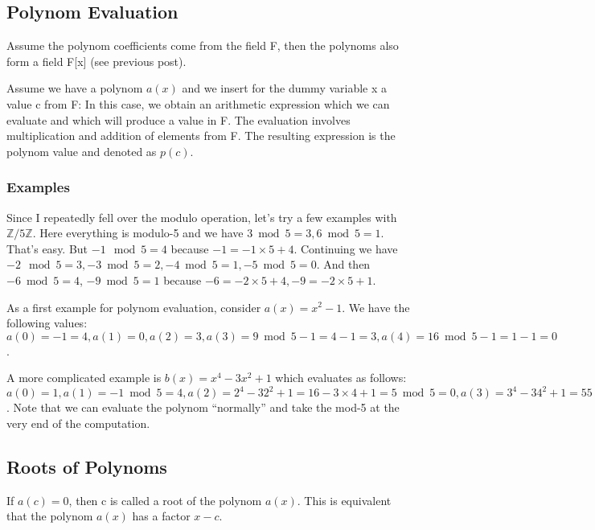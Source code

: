 
\subsection{Polynom Evaluation}\label{polynom-evaluation}

Assume the polynom coefficients come from the field F, then the polynoms
also form a field F{[}x{]} (see previous post).

Assume we have a polynom \(a(x)\) and we insert for the dummy variable x
a value c from F: In this case, we obtain an arithmetic expression which
we can evaluate and which will produce a value in F. The evaluation
involves multiplication and addition of elements from F. The resulting
expression is the polynom value and denoted as \(p(c)\).

\subsubsection{Examples}\label{examples}

Since I repeatedly fell over the modulo operation, let's try a few
examples with \(\mathbb{Z}/5\mathbb{Z}\). Here everything is modulo-5
and we have \(3 \bmod 5 = 3, 6 \bmod 5 = 1\). That's easy. But
\(-1 \mod 5 = 4\) because \(-1 = -1 \times 5 + 4\). Continuing we have
\(-2 \mod 5 = 3, -3 \bmod 5 = 2, -4 \bmod 5 = 1, -5 \bmod 5 =0\). And then
$-6 \bmod 5 = 4$, $-9 \bmod 5 = 1$ because $-6 = -2 \times 5 + 4, -9 = -2 \times 5 + 1$.

As a first example for polynom evaluation, consider \(a(x) = x^2-1\). We
have the following values:
\(a(0) = -1 = 4, a(1) = 0, a(2) = 3, a(3) = 9 \bmod 5 -1 = 4-1=3, a(4) = 16 \bmod 5 - 1 = 1 - 1 = 0\).

A more complicated example is \(b(x) = x^4 - 3x^2 + 1\) which evaluates
as follows:
\(a(0) = 1, a(1) = -1 \bmod 5 = 4, a(2) = 2^4 - 3 2^2 + 1 = 16 - 3\times 4 + 1 = 5 \bmod 5 = 0, a(3) = 3^4 - 3 4^2 + 1 = 55 \bmod 5 = 0, a(4) = 4^4 - 3 4^2 + 1 = 256 - 48 + 1 \bmod 5 = 209 \bmod 5 = 4\).
Note that we can evaluate the polynom ``normally'' and take the mod-5 at
the very end of the computation.

\subsection{Roots of Polynoms}\label{roots-of-polynoms}

If \(a(c)=0\), then c is called a root of the polynom \(a(x)\). This is
equivalent that the polynom \(a(x)\) has a factor \(x-c\).

